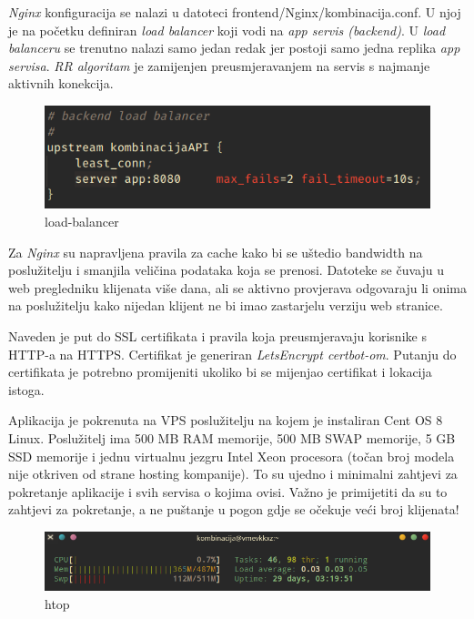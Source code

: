 		 \textit{Nginx} konfiguracija se nalazi u datoteci frontend/Nginx/kombinacija.conf. U njoj je na početku definiran  \textit{load balancer} koji vodi na  \textit{app servis (backend)}. U  \textit{load balanceru} se trenutno nalazi samo jedan redak jer postoji samo jedna replika  \textit{app servisa}.  \textit{RR algoritam} je zamijenjen preusmjeravanjem na servis s najmanje aktivnih konekcija.
		
		\begin{figure}[H]
					\includegraphics[scale=0.8]{figures/6-load-balancer.PNG}
					\centering
					\caption{load-balancer}
					\label{fig:load-balancer}
				\end{figure} 
		
		Za  \textit{Nginx} su napravljena pravila za cache kako bi se uštedio bandwidth na poslužitelju i smanjila veličina podataka koja se prenosi. Datoteke se čuvaju u web pregledniku klijenata više dana, ali se aktivno provjerava odgovaraju li onima na poslužitelju kako nijedan klijent ne bi imao zastarjelu verziju web stranice.
		
		Naveden je put do SSL certifikata i pravila koja preusmjeravaju korisnike s HTTP-a na HTTPS. Certifikat je generiran  \textit{LetsEncrypt certbot-om}. Putanju do certifikata je potrebno promijeniti ukoliko bi se mijenjao certifikat i lokacija istoga.\\
		
		
		Aplikacija je pokrenuta na VPS poslužitelju na kojem je instaliran Cent OS 8 Linux. Poslužitelj ima 500 MB RAM memorije, 500 MB SWAP memorije, 5 GB SSD memorije i jednu virtualnu jezgru Intel Xeon procesora (točan broj modela nije otkriven od strane hosting kompanije). To su ujedno i minimalni zahtjevi za pokretanje aplikacije i svih servisa o kojima ovisi. Važno je primijetiti da su to zahtjevi za pokretanje, a ne puštanje u pogon gdje se očekuje veći broj klijenata!
		
		\begin{figure}[H]
					\includegraphics[scale=0.8]{figures/7-htop.PNG}
					\centering
					\caption{htop}
					\label{fig:htop}
				\end{figure} 
		
		\eject 